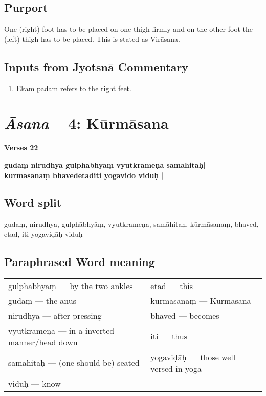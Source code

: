 \subsection*{Purport}

One (right) foot has to be placed on one thigh firmly and on the other foot the (left) thigh has to be placed. This is stated as Virāsana.

\subsection*{Inputs from Jyotsnā Commentary}

\begin{enumerate}
\item Ekam padam refers to the right feet.
\end{enumerate}
\newpage

\section*{\textit{Āsana} -- 4: Kūrmāsana}

\noindent 
\textbf{Verses 22}

\begin{shloka}
\textbf{gudaṃ nirudhya gulphābhyāṃ vyutkrameṇa samāhitaḥ|}\\
\textbf{kūrmāsanaṃ bhavedetaditi yogavido viduḥ||}
\end{shloka}

\subsection*{Word split}

gudaṃ, nirudhya, gulphābhyāṃ, vyutkrameṇa, samāhitaḥ, kūrmā\-sanaṃ, bhaved, etad, iti yogaviḍāḥ viduḥ

\subsection*{Paraphrased Word meaning}

\begin{longtable}{>{\noindent\raggedright}p{5cm}>{\noindent\raggedright}p{5cm}}
gulphābhyāṃ --- by the two ankles  & etad --- this\tabularnewline
gudaṃ --- the anus  & kūrmāsanaṃ --- Kurmāsana\tabularnewline
nirudhya --- after pressing & bhaved --- becomes\tabularnewline
vyutkrameṇa --- in a inverted manner/head down & iti --- thus\tabularnewline
samāhitaḥ --- (one should be) seated  & yogaviḍāḥ --- those well versed in yoga\tabularnewline
viduḥ --- know & 
\end{longtable}


